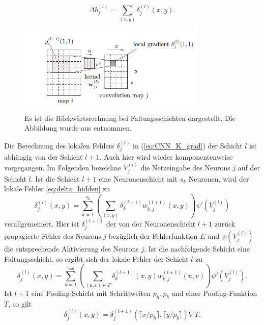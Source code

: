 \begin{equation*}
    \Delta b_j^{(l)}= \sum_{(x,y)} \delta_j^{(l)}(x,y).
\end{equation*}

\begin{figure}[h]
    \includegraphics[width=0.8\textwidth]{pics/chapters/CCN/backprop_dudiss.png}
    \centering
    \caption{Es ist die Rückwärtsrechnung bei Faltungsschichten dargestellt. Die Abbildung wurde aus \cite{du_diss} entnommen.}
    \label{abb:error_conv}
\end{figure}
Die Berechnung des lokalen Fehlers $\delta_{j}^{(l)}$ in (\ref{eq:CNN_K_grad}) der Schicht $l$ ist abhängig von der Schicht $l+1$. Auch hier wird wieder komponentenweise vorgegangen. Im Folgenden bezeichne $V_j^{(l)}$ die Netzeingabe des Neurons $j$ auf der Schicht $l$.
Ist die Schicht $l+1$ eine Neuronenschicht mit $s_k$ Neuronen, wird der lokale Fehler \ref{eq:delta_hidden} zu
\begin{equation*}
    \delta_j^{(l)}(x,y)=\sum_{k=1}^{s_{k}} \left(\sum_{(x,y)} \delta_k^{(l+1)} w_{k,j}^{(l+1)}(x,y)\right) \psi'(V_j^{(l)})
\end{equation*}
verallgemeinert. 
Hier ist $\delta_j^{(l+1)}$ der von der Neuronenschicht $l+1$ zurück propagierte Fehler des Neurons $j$ bezüglich der Fehlerfunktion $E$ und $\psi(V^{(l)}_j)$ die entsprechende Aktivierung des Neurons $j$.
Ist die nachfolgende Schicht eine Faltungsschicht, so ergibt sich der lokale Fehler der Schicht $l$ zu
\begin{equation*}
    \delta_j^{(l)}(x,y)=\sum_{k=1}^{z_{out}} \left(\sum_{(u,v) \in F} \delta_k^{(l+1)}(x,y) w_{k,j}^{(l+1)}(u,v)\right) \psi'(V_j^{(l)}).
\end{equation*}
Ist $l+1$ eine Pooling-Schicht mit Schrittweiten $p_h,p_b$ und einer Pooling-Funktion $T$, so gilt
\begin{equation}
    \label{eq:upsample1}
    \delta_j^{(l)}(x,y)=\delta_j^{(l+1)}(\lceil x/p_h \rceil ,\lceil y/p_b \rceil)\nabla T.
\end{equation}
